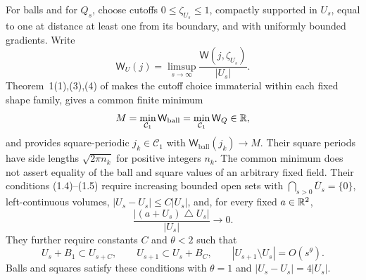 For balls and for $Q_s$, choose cutoffs $0\le\zeta_{U_s}\le1$,
compactly supported in $U_s$, equal to one at distance at least one
from its boundary, and with uniformly bounded gradients.  Write
\[
 \mathsf W_U(j)=\limsup_{s\to\infty}
       \frac{\mathsf W(j,\zeta_{U_s})}{|U_s|}.
\]
Theorem~1(1),(3),(4) of \cite{SandierSerfaty2012} makes the cutoff
choice immaterial within each fixed shape family, gives a common finite
minimum
\begin{equation}\label{red:M}
 M=\min_{\mathcal C_1}\mathsf W_{\mathrm{ball}}
   =\min_{\mathcal C_1}\mathsf W_Q\in\mathbb R,
\end{equation}
and provides square-periodic $j_k\in\mathcal C_1$ with
$\mathsf W_{\mathrm{ball}}(j_k)\to M$.  Their square periods have
side lengths $\sqrt{2\pi n_k}$ for positive integers $n_k$.
The common minimum does not assert equality of the ball and square
values of an arbitrary fixed field.
Their conditions (1.4)--(1.5) require increasing bounded open sets
with $\bigcap_{s>0}\overline U_s=\{0\}$, left-continuous volumes,
$|U_s-U_s|\le C|U_s|$, and, for every fixed $a\in\mathbb R^2$,
\[
 \frac{|(a+U_s)\mathbin\triangle U_s|}{|U_s|}\longrightarrow0.
\]
They further require constants $C$ and $\theta<2$ such that
\[
 U_s+B_1\subset U_{s+C},\qquad
 U_{s+1}\subset U_s+B_C,\qquad
 |U_{s+1}\setminus U_s|=O(s^\theta).
\]
Balls and squares satisfy these conditions with $\theta=1$ and
$|U_s-U_s|=4|U_s|$.

